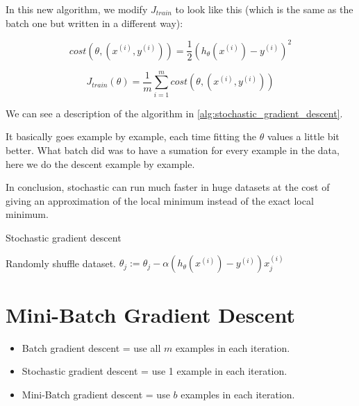 \documentclass[10pt]{extarticle}
\begin{document}
In this new algorithm, we modify $J_{train}$ to look like this (which is
the same as the batch one but written in a different way):

\begin{equation}
cost(\theta, (x^{(i)}, y^{(i)})) = \frac{1}{2} (h_\theta(x^{(i)}) - y^{(i)}) ^2
\end{equation}

\begin{equation}
J_{train}(\theta) = \frac{1}{m} \sum_{i=1}^m cost(\theta,(x^{(i)}, y^{(i)})) 
\end{equation}

We can see a description of the algorithm in
\cref{alg:stochastic_gradient_descent}.

It basically goes example by example, each time fitting the $\theta$
values a little bit better. What batch did was to have a sumation for
every example in the data, here we do the descent example by example.

In conclusion, stochastic can run much faster in huge datasets at the
cost of giving an approximation of the local minimum instead of the
exact local minimum.

\begin{algorithm}
    \caption{Stochastic gradient descent}
    \label{alg:stochastic_gradient_descent}
\begin{algorithmic}[1]
\State Randomly shuffle dataset.
\State \Repeat
      
          
            \State $\theta_j := \theta_j - \alpha (h_\theta(x^{(i)}) - y^{(i)}) x_j^{(i)}$
        \EndFor
    \EndFor
{}  
\end{algorithmic}
\end{algorithm}

\section{Mini-Batch Gradient Descent}\label{mini-batch-gradient-descent}

\begin{itemize}
\itemsep1pt\parskip0pt
\item
  Batch gradient descent = use all $m$ examples in each iteration.
\item
  Stochastic gradient descent = use 1 example in each iteration.
\item
  Mini-Batch gradient descent = use $b$ examples in each iteration.
\end{itemize}
\end{document}
